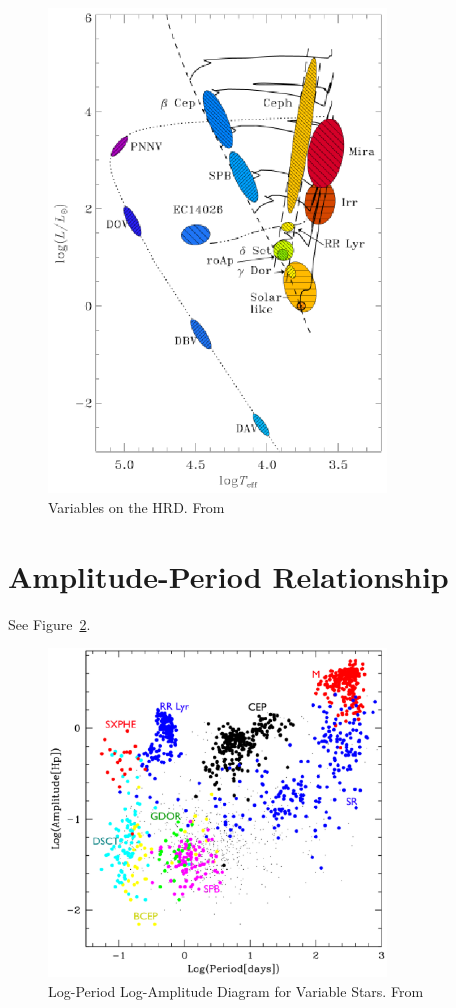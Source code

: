 \documentclass{spy}
\begin{document}
\begin{figure}[ht]
    \centering
    \includegraphics[width=0.8\textwidth]{hrd_variables.eps}
    \caption{Variables on the HRD. From \citet{MiraVariablesPeriod}}
    \label{hrd_variables_diagram}
\end{figure}


\section{Amplitude-Period Relationship}
See Figure~\ref{period_amp_diagram}.

\begin{figure}[ht]
    \centering
    \includegraphics[width=0.8\textwidth]{period_amplitude.eps}
    \caption{Log-Period Log-Amplitude Diagram for Variable Stars. From \citet{eyerVariableStarsObservational2008}}
    \label{period_amp_diagram}
\end{figure}
\end{document}
